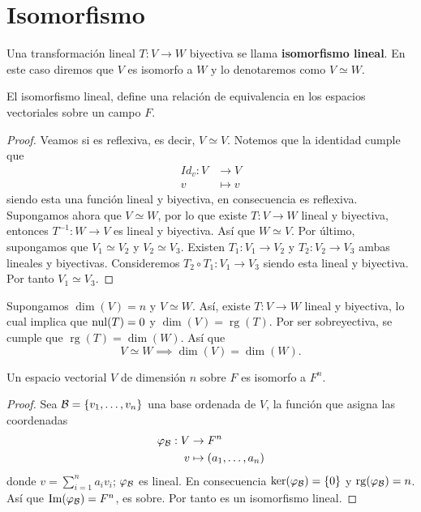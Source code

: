 \documentclass[12pt,a4paper]{book}
\newcommand{\rg}{\operatorname{rg}}
\newcommand{\llaves}[1]{\{#1\}}
\begin{document}
    \section{Isomorfismo}

    \begin{definicion}
    \label{def:24}
        Una transformación lineal $T:V \to W$ biyectiva se llama \textbf{isomorfismo lineal}. En este caso diremos que $V$ es isomorfo a
        $W$ y lo denotaremos como $V \simeq W$.
    \end{definicion}

    \begin{proposicion}
    \label{prop:29}
        El isomorfismo lineal, define una relación de equivalencia en los espacios vectoriales sobre un campo $F$.
    \end{proposicion}

    \begin{proof}
        Veamos si es reflexiva, es decir, $V \simeq V$. Notemos que la identidad cumple que
        \begin{align*}
            Id_{v}: V & \to V\\
            v & \mapsto v
        \end{align*}
        siendo esta una función lineal y biyectiva, en consecuencia es reflexiva.
        Supongamos ahora que $V \simeq W$, por lo que existe $T: V \to W$ lineal y biyectiva, entonces $T^{-1}: W \to V$ es lineal y biyectiva. Así que $W \simeq V$.
        Por último, supongamos que $V_{1} \simeq V_{2}$ y $V_{2} \simeq V_{3}$. Existen $T_{1}:V_{1} \to V_{2}$ y $T_{2}: V_{2} \to V_{3}$ ambas lineales y biyectivas. Consideremos $T_{2} \circ T_{1}: V_{1} \to V_{3}$ siendo esta lineal y biyectiva. Por tanto $V_{1} \simeq V_{3}$.
    \end{proof}

    Supongamos $\dim(V) = n$ y $V \simeq W$. Así, existe $T: V \to W$ lineal y biyectiva, lo cual implica que $\operatorname{nul}(T) = 0$ y $\dim(V) = \rg(T)$. Por ser sobreyectiva, se cumple que $\rg(T) = \dim(W)$. Así que
    \begin{equation*}
        V \simeq W \implies \dim(V) = \dim(W).
    \end{equation*}

    \begin{teorema}
    \label{teo:7}
        Un espacio vectorial $V$ de dimensión $n$ sobre $F$ es isomorfo a $F^{n}$.
    \end{teorema}

    \begin{proof}
        Sea $\BB = \llaves{v_{1}, \dots , v_{n}}$ una base ordenada de $V$, la función que asigna las coordenadas
        \begin{align*}
            \varphi_{\mathcal{B}}: V & \to F^{n}\\
            v & \mapsto (a_{1}, \dots, a_{n})
        \end{align*}
        donde $v = \sum_{i = 1}^{n} a_{i}v_{i}$; $\varphi_{\mathcal{B}}$ es lineal. En consecuencia $\ker(\varphi_{\BB}) = \llaves{0}$ y $\rg(\varphi_{\BB}) = n$. Así que $\Im(\varphi_{\mathcal{B}}) = F^{n}$, es sobre. Por tanto es un isomorfismo lineal.
    \end{proof}
\end{document}
